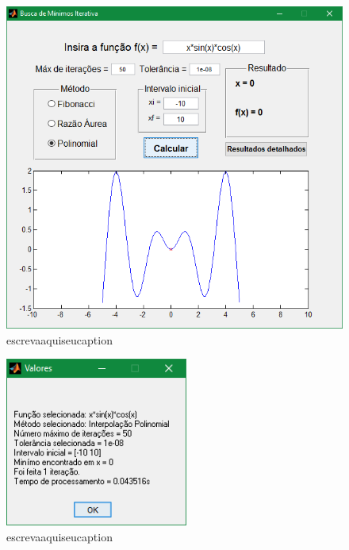 \begin{figure}[H]
	\begin{center}	
		\includegraphics[width=14cm]{../interpol/f2_gui.PNG}
		\caption{escrevaaquiseucaption}
		\label{fig:f2_gui}
	\end{center}
\end{figure}

\begin{figure}[H]
	\begin{center}	
		\includegraphics[width=6cm]{../interpol/f2_resultados.PNG}
		\caption{escrevaaquiseucaption}
		\label{fig:f2_resultados}
	\end{center}
\end{figure}

